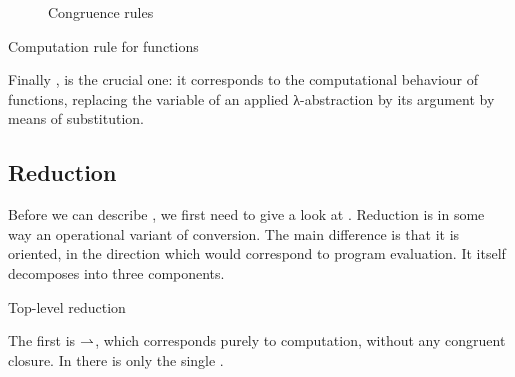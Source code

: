 \begin{figure}[h]
  \ContinuedFloat
  \caption{Congruence rules}
  \label{fig:cic-uconv-cong}
\end{figure}

\begin{marginfigure}
  \ContinuedFloat
  \begin{mathpar}
    \label{rule:cic-uconv-beta}
  \end{mathpar}
  \caption{Computation rule for functions}
\end{marginfigure}
Finally , is the crucial one:
it corresponds to the computational behaviour
of functions, replacing the variable of an applied λ-abstraction by its argument by
means of substitution.

\subsection{Reduction}

Before we can describe , we first need
to give a look at . Reduction is in some way an operational variant of
conversion. The main difference is that it is oriented, in the direction which would
correspond to program evaluation. It itself decomposes into three components.

\begin{marginfigure}
  \ContinuedFloat*
  \begin{mathpar}
    \label{rule:beta-red}
  \end{mathpar}
  \caption{Top-level reduction}
\end{marginfigure}

The first is  $\tred$, which corresponds purely to computation, without any congruent closure.
In  there is only the single .

